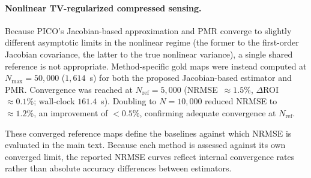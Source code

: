 \documentclass[AMA,STIX2COL,Linenumberson]{MRM}
\begin{document}
\paragraph{Nonlinear TV-regularized compressed sensing.}
Because PICO's Jacobian-based approximation and PMR converge to slightly different asymptotic limits in the nonlinear regime (the former to the first-order Jacobian covariance, the latter to the true nonlinear variance), a single shared reference is not appropriate. Method-specific gold maps were instead computed at 
$N_{\max} = 50{,}000$ ($1{,}614$~s) for both the proposed 
Jacobian-based estimator and PMR. Convergence was reached 
at $N_{\mathrm{ref}} = 5{,}000$ 
(NRMSE~$\approx 1.5\%$, 
$\Delta$ROI~$\approx 0.1\%$; wall-clock $161.4$~s). 
Doubling to $N = 10{,}000$ reduced NRMSE to 
$\approx 1.2\%$, an improvement of $<0.5\%$, confirming 
adequate convergence at $N_{\mathrm{ref}}$.
 
These converged reference maps define the baselines against 
which NRMSE is evaluated in the main text. Because each 
method is assessed against its own converged limit, the 
reported NRMSE curves reflect internal convergence rates 
rather than absolute accuracy differences between estimators.
\end{document}

